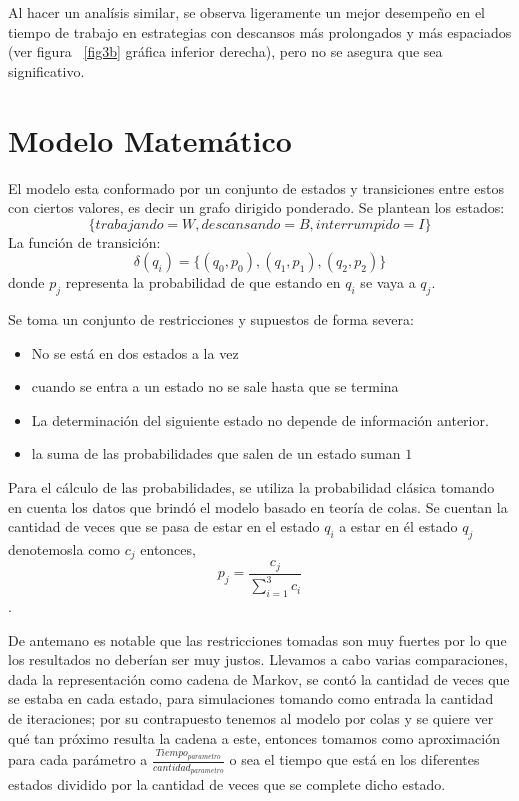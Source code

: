 \documentclass[10pt,a4paper,twocolumn]{article}
\begin{document}
Al hacer un analísis similar, se observa ligeramente un mejor desempeño en el tiempo de trabajo en estrategias con descansos más prolongados y más espaciados (ver figura ~\ref{fig3b} gráfica inferior derecha), pero no se asegura que sea significativo.



\section{Modelo Matem\'atico}

El modelo esta conformado por un conjunto de estados y transiciones entre estos con ciertos valores, es decir un grafo dirigido ponderado. Se plantean los estados:  $$\{trabajando = W, descansando = B, interrumpido = I\}$$ La funci\'on de transici\'on: $$\delta(q_i) = \{(q_0, p_0), (q_1, p_1), (q_2, p_2)\}$$ donde $p_j$ representa la probabilidad de que estando en $q_i$ se vaya a $q_j$.

Se toma un conjunto de restricciones y supuestos de forma severa:
\begin{itemize}
    \item No se est\'a en dos estados a la vez
    \item cuando se entra a un estado no se sale hasta que se termina
    \item La determinación del siguiente estado no depende de información anterior.
    \item la suma de las probabilidades que salen de un estado suman $1$
\end{itemize} 

Para el c\'alculo de las probabilidades, se utiliza la probabilidad cl\'asica tomando en cuenta los datos que brind\'o el modelo basado en teor\'ia de colas. Se cuentan la cantidad de veces que se pasa de estar en el estado $q_i$ a estar en \'el estado $q_j$ denotemosla como $c_j$ entonces, $$p_j = \frac{c_j}{\sum_{i=1}^{3} c_i}$$.

De antemano es notable que las restricciones tomadas son muy fuertes por lo que los resultados no deber\'ian ser muy justos. Llevamos a cabo varias comparaciones, dada la representaci\'on como cadena de Markov, se cont\'o la cantidad de veces que se estaba en cada estado, para simulaciones tomando como entrada la cantidad de iteraciones; por su contrapuesto tenemos al modelo por colas y se quiere ver qu\'e tan pr\'oximo resulta la cadena a este, entonces tomamos como aproximaci\'on para cada par\'ametro a $\frac{Tiempo_{parametro}}{cantidad_{parametro}}$ o sea el tiempo que est\'a en los diferentes estados dividido por la cantidad de veces que se complete dicho estado.
\end{document}

